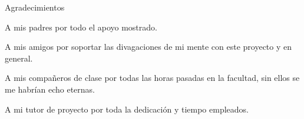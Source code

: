 %
%
%
%

\thispagestyle{empty}

{\flushright

	\begin{LARGE}
		Agradecimientos
	\end{LARGE}

	\hspace{3mm}

	\begin{large}

		\hspace{3mm}
		A mis padres por todo el apoyo mostrado.
	
		\hspace{3mm}
		A mis amigos por soportar las divagaciones de mi mente con este proyecto y en general.
	
		\hspace{3mm}
		A mis compañeros de clase por todas las horas pasadas en la facultad, sin ellos se me habrían echo eternas.
	
		\hspace{3mm}
		A mi tutor de proyecto por toda la dedicación y tiempo empleados.

	\end{large}

}